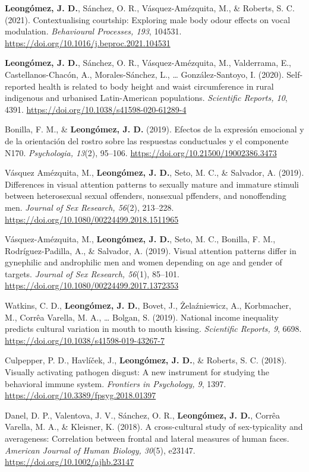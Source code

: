 \documentclass[11pt,a4paper,]{awesome-cv}
\begin{document}
\textbf{Leongómez, J. D.}, Sánchez, O. R., Vásquez-Amézquita, M., \&
Roberts, S. C. (2021). Contextualising courtship: Exploring male body
odour effects on vocal modulation. \emph{Behavioural Processes, 193},
104531. \url{https://doi.org/10.1016/j.beproc.2021.104531}

\textbf{Leongómez, J. D.}, Sánchez, O. R., Vásquez-Amézquita, M.,
Valderrama, E., Castellanos-Chacón, A., Morales-Sánchez, L., \ldots{}
González-Santoyo, I. (2020). Self-reported health is related to body
height and waist circumference in rural indigenous and urbanised
Latin-American populations. \emph{Scientific Reports, 10}, 4391.
\url{https://doi.org/10.1038/s41598-020-61289-4}

Bonilla, F. M., \& \textbf{Leongómez, J. D.} (2019). Efectos de la
expresión emocional y de la orientación del rostro sobre las respuestas
conductuales y el componente N170. \emph{Psychologia, 13}(2), 95--106.
\url{https://doi.org/10.21500/19002386.3473}

Vásquez Amézquita, M., \textbf{Leongómez, J. D.}, Seto, M. C., \&
Salvador, A. (2019). Differences in visual attention patterns to
sexually mature and immature stimuli between heterosexual sexual
offenders, nonsexual pffenders, and nonoffending men. \emph{Journal of
Sex Research, 56}(2), 213--228.
\url{https://doi.org/10.1080/00224499.2018.1511965}

Vásquez-Amézquita, M., \textbf{Leongómez, J. D.}, Seto, M. C., Bonilla,
F. M., Rodríguez-Padilla, A., \& Salvador, A. (2019). Visual attention
patterns differ in gynephilic and androphilic men and women depending on
age and gender of targets. \emph{Journal of Sex Research, 56}(1),
85--101. \url{https://doi.org/10.1080/00224499.2017.1372353}

Watkins, C. D., \textbf{Leongómez, J. D.}, Bovet, J., Żelaźniewicz, A.,
Korbmacher, M., Corrêa Varella, M. A., \ldots{} Bolgan, S. (2019).
National income inequality predicts cultural variation in mouth to mouth
kissing. \emph{Scientific Reports, 9}, 6698.
\url{https://doi.org/10.1038/s41598-019-43267-7}

Culpepper, P. D., Havlíček, J., \textbf{Leongómez, J. D.}, \& Roberts,
S. C. (2018). Visually activating pathogen disgust: A new instrument for
studying the behavioral immune system. \emph{Frontiers in Psychology,
9}, 1397. \url{https://doi.org/10.3389/fpsyg.2018.01397}

Danel, D. P., Valentova, J. V., Sánchez, O. R.,
\textbf{Leongómez, J. D.}, Corrêa Varella, M. A., \& Kleisner, K.
(2018). A cross-cultural study of sex-typicality and averageness:
Correlation between frontal and lateral measures of human faces.
\emph{American Journal of Human Biology, 30}(5), e23147.
\url{https://doi.org/10.1002/ajhb.23147}
\end{document}

